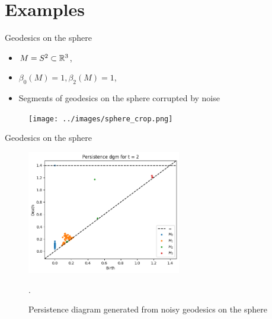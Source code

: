 \documentclass{beamer}
\begin{document}

\section{Examples}

\begin{frame}{Geodesics on the sphere}
    \begin{itemize}
        \item $M = S^2 \subset \mathbb{R}^3$, \pause 
        \item $\beta_0(M) = 1, \beta_2(M) = 1$, \pause
        \item Segments of geodesics on the sphere corrupted by noise
    \end{itemize}
    \begin{figure}
    \texttt{[image: ../images/sphere\_crop.png]}
    \end{figure}
\end{frame}
\begin{frame}{Geodesics on the sphere}
        \begin{figure}
        \includegraphics[width=0.6\textwidth]{../images/sphere_pdgm.png}
        \caption{Persistence diagram generated from noisy geodesics on the sphere}.
        \end{figure}
\end{frame}
\end{document}
